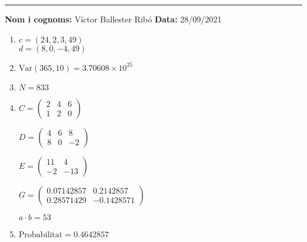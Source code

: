 \documentclass[10pt]{article}
\begin{document}

\vspace{0.5cm}
\rule{\textwidth}{2pt}

\vspace{1.5cm}
{\large\textbf{Nom i cognoms:} Víctor Ballester Ribó}
\hfill
{\large\textbf{Data:} 28/09/2021}

\vspace{2cm}
\begin{enumerate}[leftmargin=*]
      \item $c=(24,2,3,49)$\\
            $d=(8,0,-4,49)$
      \item $\text{Var}(365,10)=3.70608\times10^{25}$
      \item $N=833$
      \item \hfill

            \vspace{1cm}
            $\displaystyle C=
                  \begin{pmatrix}
                        2 & 4 & 6 \\
                        1 & 2 & 0
                  \end{pmatrix}$

            \vspace{1cm}
            $\displaystyle D=
                  \begin{pmatrix}
                        4 & 6 & 8  \\
                        8 & 0 & -2
                  \end{pmatrix}$

            \vspace{1cm}
            $\displaystyle E=
                  \begin{pmatrix}
                        11 & 4   \\
                        -2 & -13
                  \end{pmatrix}$

            \vspace{1cm}
            $\displaystyle G=
                  \begin{pmatrix}
                        0.07142857 & 0.2142857  \\
                        0.28571429 & -0.1428571
                  \end{pmatrix}$

            \vspace{1cm}
            $a\cdot b=53$
      \item $\text{Probabilitat}=0.4642857$
\end{enumerate}
\end{document}
